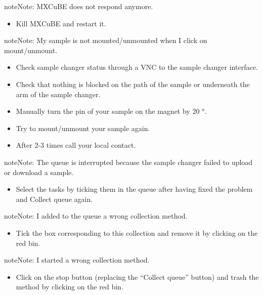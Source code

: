 \documentclass[a4paper,10pt,english]{sphinxmanual}
\begin{document}
\begin{notice}{note}{Note:}
MXCuBE does not respond anymore.
\end{notice}
\begin{itemize}
\item {} 
Kill MXCuBE and restart it.

\end{itemize}

\begin{notice}{note}{Note:}
My sample is not mounted/unmounted when I click on mount/unmount.
\end{notice}
\begin{itemize}
\item {} 
Check sample changer status through a VNC to the sample changer interface.

\item {} 
Check that nothing is blocked on the path of the sample or underneath the arm of the sample changer.

\item {} 
Manually turn the pin of your sample on the magnet by 20 °.

\item {} 
Try to mount/unmount your sample again.

\item {} 
After 2-3 times call your local contact.

\end{itemize}

\begin{notice}{note}{Note:}
The queue is interrupted because the sample changer failed to upload or download a sample.
\end{notice}
\begin{itemize}
\item {} 
Select the tasks by ticking them in the queue after having fixed the problem and Collect queue again.

\end{itemize}

\begin{notice}{note}{Note:}
I added to the queue a wrong collection method.
\end{notice}
\begin{itemize}
\item {} 
Tick the box corresponding to this collection and remove it by clicking on the red bin.

\end{itemize}

\begin{notice}{note}{Note:}
I started a wrong collection method.
\end{notice}
\begin{itemize}
\item {} 
Click on the stop button (replacing the “Collect queue” button) and trash the method by clicking on the red bin.

\end{itemize}
\end{document}
